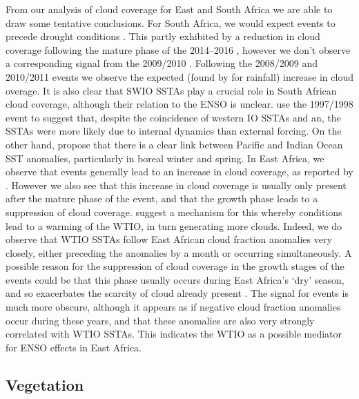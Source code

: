 From our analysis of cloud coverage for East and South Africa we are
able to draw some tentative conclusions. For South Africa, we would
expect \elnino{} events to precede drought conditions
\cite{TODO}. This partly exhibited by a reduction in cloud coverage
following the mature phase of the 2014--2016 \elnino{}, however we
don't observe a corresponding signal from the 2009/2010
\elnino{}. Following the 2008/2009 and 2010/2011 \nina{} events we
observe the expected (found by \cite{nicholson2000} for rainfall)
increase in cloud overage. It is also clear that SWIO SSTAs play a
crucial role in South African cloud coverage, although their relation
to the ENSO is unclear. \cite{webster1999} use the 1997/1998 \elnino{}
event to suggest that, despite the coincidence of western IO SSTAs and
an, the SSTAs were more likely due to internal dynamics than external
forcing. On the other hand, \cite{alexander2002} propose that there is
a clear link between Pacific and Indian Ocean SST anomalies,
particularly in boreal winter and spring. In East Africa, we observe
that \elnino{} events generally lead to an increase in cloud coverage,
as reported by \cite{TODO}. However we also see that this increase in
cloud coverage is usually only present after the mature phase of the
\elnino{} event, and that the growth phase leads to a suppression of
cloud coverage. \cite{parhi2016} suggest a mechanism for this whereby
\elnino{} conditions lead to a warming of the WTIO, in turn generating
more clouds. Indeed, we do observe that WTIO SSTAs follow East African
cloud fraction anomalies very closely, either preceding the anomalies
by a month or occurring simultaneously. A possible reason for the
suppression of cloud coverage in the growth stages of the \elnino{}
events could be that this phase usually occurs during East Africa's
`dry' season, and so exacerbates the scarcity of cloud already present
\cite{TODO}. The signal for \nina{} events is much more obscure,
although it appears as if negative cloud fraction anomalies occur
during these years, and that these anomalies are also very strongly
correlated with WTIO SSTAs. This indicates the WTIO as a possible
mediator for ENSO effects in East Africa.

\subsection{Vegetation} 

